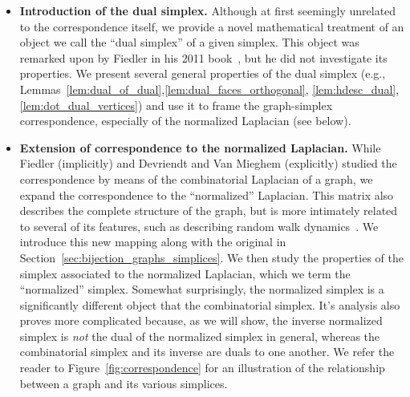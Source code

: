 \begin{itemize}
	\item {\bf Introduction of the dual simplex.} Although at first seemingly unrelated to the correspondence itself, we provide a  novel mathematical treatment of an object we call the ``dual simplex'' of a given simplex. This object was remarked upon by Fiedler in his 2011 book~\cite{fiedler2011matrices}, but he did not investigate its properties. We present several general properties of  the dual simplex (e.g., Lemmas~\ref{lem:dual_of_dual},\ref{lem:dual_faces_orthogonal},  \ref{lem:hdesc_dual}, \ref{lem:dot_dual_vertices}) and use it to frame the graph-simplex correspondence, especially of the normalized Laplacian (see below). 
	\item {\bf Extension of correspondence to the normalized Laplacian.}  While Fiedler (implicitly) and Devriendt and Van Mieghem (explicitly) studied the correspondence by means of the combinatorial Laplacian of a graph, we expand the correspondence to the ``normalized'' Laplacian.  This matrix also describes the complete structure of the graph, but is more intimately related to several of its features, such as describing random walk dynamics~\cite{chung1997spectral}. We introduce this new mapping  along with the original in Section~\ref{sec:bijection_graphs_simplices}. 
	We then study the properties of the simplex associated to the normalized Laplacian, which we term the ``normalized'' simplex.  
	Somewhat surprisingly, the normalized simplex is a significantly different object that the combinatorial  simplex. It's analysis  also proves more complicated because, as we will show, the inverse normalized simplex  is \emph{not} the dual of the normalized  simplex in general, whereas the combinatorial simplex and its inverse are duals to  one  another. 	 
	We refer  the reader to Figure~\ref{fig:correspondence} for an illustration of the relationship between a graph and its various simplices. 
	

\end{itemize}
